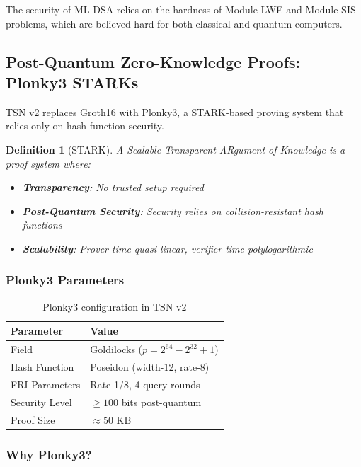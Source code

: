 \documentclass[11pt,a4paper]{article}
\newtheorem{definition}{Definition}
\begin{document}
The security of ML-DSA relies on the hardness of Module-LWE and Module-SIS problems, which are believed hard for both classical and quantum computers.

\subsection{Post-Quantum Zero-Knowledge Proofs: Plonky3 STARKs}

TSN v2 replaces Groth16 with Plonky3, a STARK-based proving system that relies only on hash function security.

\begin{definition}[STARK]
A Scalable Transparent ARgument of Knowledge is a proof system where:
\begin{itemize}
    \item \textbf{Transparency}: No trusted setup required
    \item \textbf{Post-Quantum Security}: Security relies on collision-resistant hash functions
    \item \textbf{Scalability}: Prover time quasi-linear, verifier time polylogarithmic
\end{itemize}
\end{definition}

\subsubsection{Plonky3 Parameters}

\begin{table}[h]
\centering
\begin{tabular}{ll}
\toprule
Parameter & Value \\
\midrule
Field & Goldilocks ($p = 2^{64} - 2^{32} + 1$) \\
Hash Function & Poseidon (width-12, rate-8) \\
FRI Parameters & Rate 1/8, 4 query rounds \\
Security Level & $\geq 100$ bits post-quantum \\
Proof Size & $\approx 50$ KB \\
\bottomrule
\end{tabular}
\caption{Plonky3 configuration in TSN v2}
\end{table}

\subsubsection{Why Plonky3?}
\end{document}
